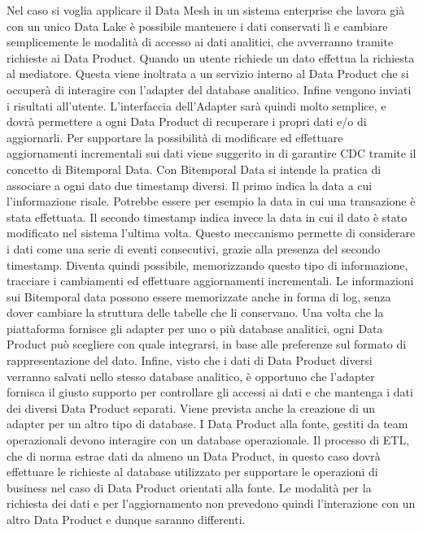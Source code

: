 \documentclass[a4paper,12pt]{report}
\begin{document}
Nel caso si voglia applicare il Data Mesh in un sistema enterprise che lavora già con un unico Data Lake è possibile mantenere i dati conservati lì e cambiare semplicemente le modalità di accesso ai dati analitici, che avverranno tramite richieste ai Data Product.
Quando un utente richiede un dato effettua la richiesta al mediatore.
Questa viene inoltrata a un servizio interno al Data Product che si occuperà di interagire con l'adapter del database analitico. 
Infine vengono inviati i risultati all'utente.
L'interfaccia dell'Adapter sarà quindi molto semplice, e dovrà permettere a ogni Data Product di recuperare i propri dati e/o di aggiornarli.
Per supportare la possibilità di modificare ed effettuare aggiornamenti incrementali sui dati viene suggerito in \cite{zhamak_dehgani_data_2023,fowlerBitemporalNodate}
di garantire CDC tramite il concetto di Bitemporal Data.
Con Bitemporal Data si intende la pratica di associare a ogni dato due timestamp diversi. 
Il primo indica la data a cui l'informazione risale. 
Potrebbe essere per esempio la data in cui una transazione è stata effettuata.
Il secondo timestamp indica invece la data in cui il dato è stato modificato nel sistema l'ultima volta.
Questo meccanismo permette di considerare i dati come una serie di eventi consecutivi, grazie alla presenza del secondo timestamp.
Diventa quindi possibile, memorizzando questo tipo di informazione, tracciare i cambiamenti ed effettuare aggiornamenti incrementali.
Le informazioni sui Bitemporal data possono essere memorizzate anche in forma di log, senza dover cambiare la struttura delle tabelle che li conservano.
Una volta che la piattaforma fornisce gli adapter per uno o più database analitici, ogni Data Product può scegliere con quale integrarsi, in base alle preferenze sul formato di rappresentazione del dato.
Infine, visto che i dati di Data Product diversi verranno salvati nello stesso database analitico, è opportuno che l'adapter fornisca il giusto supporto per controllare gli accessi ai dati e che mantenga i dati dei diversi Data Product separati.
Viene prevista anche la creazione di un adapter per un altro tipo di database.
I Data Product alla fonte, gestiti da team operazionali devono interagire con un database operazionale.
Il processo di ETL, che di norma estrae dati da almeno un Data Product, in questo caso dovrà effettuare le richieste al database utilizzato per supportare le operazioni di business nel caso di Data Product orientati alla fonte.
Le modalità per la richiesta dei dati e per l'aggiornamento non prevedono quindi l'interazione con un altro Data Product e dunque saranno differenti.
\end{document}
